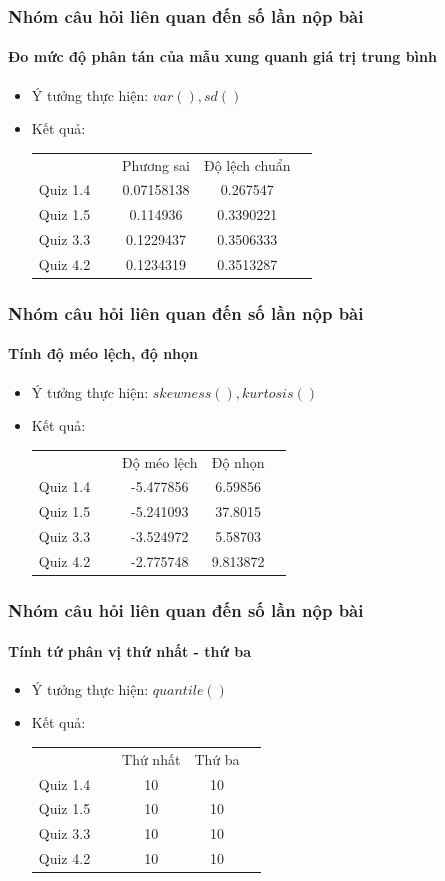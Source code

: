 \documentclass[english,10pt,table]{beamer}
\begin{document}
\frame
{
\frametitle{Nhóm câu hỏi liên quan đến số lần nộp bài}
\framesubtitle{Đo mức độ phân tán của mẫu xung quanh giá trị trung bình}
\begin{itemize}
    \item Ý tưởng thực hiện: $var(), sd()$
    \item Kết quả:\\
    \begin{center}
        \begin{tabular}{l l c c c}
             & & Phương sai & Độ lệch chuẩn\\
             Quiz 1.4 & $\;$ & 0.07158138 & 0.267547\\
             Quiz 1.5 & $\;$ & 0.114936 & 0.3390221\\
             Quiz 3.3 & $\;$ & 0.1229437 & 0.3506333\\
             Quiz 4.2 & $\;$ & 0.1234319 & 0.3513287
        \end{tabular}
    \end{center}
\end{itemize}
}

\frame
{
\frametitle{Nhóm câu hỏi liên quan đến số lần nộp bài}
\framesubtitle{Tính độ méo lệch, độ nhọn}
\begin{itemize}
    \item Ý tưởng thực hiện: $skewness(), kurtosis()$
    \item Kết quả:\\
    \begin{center}
        \begin{tabular}{l l c c c}
             & & Độ méo lệch & Độ nhọn\\
             Quiz 1.4 & $\;$ & -5.477856 & 6.59856\\
             Quiz 1.5 & $\;$ & -5.241093 & 37.8015\\
             Quiz 3.3 & $\;$ & -3.524972 & 5.58703\\
             Quiz 4.2 & $\;$ & -2.775748 & 9.813872
        \end{tabular}
    \end{center}
\end{itemize}
}

\frame
{
\frametitle{Nhóm câu hỏi liên quan đến số lần nộp bài}
\framesubtitle{Tính tứ phân vị thứ nhất - thứ ba}
\begin{itemize}
    \item Ý tưởng thực hiện: $quantile()$
    \item Kết quả:\\
    \begin{center}
        \begin{tabular}{l l c c c}
             & & Thứ nhất & Thứ ba\\
             Quiz 1.4 & $\;$ & 10 & 10\\
             Quiz 1.5 & $\;$ & 10 & 10\\
             Quiz 3.3 & $\;$ & 10 & 10\\
             Quiz 4.2 & $\;$ & 10 & 10
        \end{tabular}
    \end{center}
\end{itemize}
}
\end{document}
